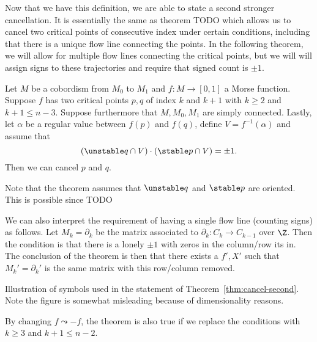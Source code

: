 Now that we have this definition, we are able to state a second stronger cancellation.
It is essentially the same as theorem TODO which allows us to cancel two critical points of consecutive index under certain conditions, including that there is a unique flow line connecting the points.
In the following theorem, we will allow for multiple flow lines connecting the critical points, but we will will assign signs to these trajectories and require that signed count is $\pm 1$.

\begin{theorem}
    Let $M$ be a cobordism from  $M_0$ to $M_1$ and $f: M \to  [0,1]$ a Morse function.
    Suppose $f$ has two critical points $p, q$ of index $k$ and $k+1$ with $k \ge  2$ and $k + 1 \le  n-3$.
    Suppose furthermore that $M, M_0, M_1$ are simply connected.
    Lastly, let $\alpha$ be a regular value between $f(p)$ and  $f(q)$, define $V = f^{-1}(\alpha)$ and assume that
    \[
        (\unstable q \cap V) \cdot
        (\stable p \cap V) = \pm 1
    .\] 
    Then we can cancel $p$ and $q$.
    \label{thm:cancel-second}
\end{theorem}
\begin{remark}
    Note that the theorem assumes that $\unstable q$ and $\stable p$ are oriented. 
    This is possible since TODO
\end{remark}
\begin{remark}
    We can also interpret the requirement of having a single flow line (counting signs) as follows.
    Let $M_k = \partial_k$ be the matrix associated to $\partial_k: C_{k} \to  C_{k-1}$ over $\Z$.
    Then the condition is that there is a lonely $\pm 1$ with zeros in the column/row its in.
    The conclusion of the theorem is then that there exists a $f', X'$ such that  $M_k' = \partial_k'$ is the same matrix with this row/column removed.

\end{remark}

\begin{marginfigure}
    \centering
    \caption{Illustration of symbols used in the statement of Theorem~\ref{thm:cancel-second}. Note the figure is somewhat misleading because of dimensionality reasons.}
    \label{fig:second-cancellation-theorem-setup}
\end{marginfigure}
\begin{remark}
    By changing $f \leadsto -f$, the theorem is also true if we replace the conditions with  $k \ge  3$ and $k + 1 \le  n-2$.
\end{remark}

